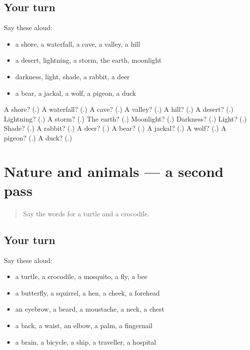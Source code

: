 \subsection*{Your turn}
Say these aloud:

\begin{itemize}
\raggedright
  \item a shore, a waterfall, a cave, a valley, a hill
  \item a desert, lightning, a storm, the earth, moonlight
  \item darkness, light, shade, a rabbit, a deer
  \item a bear, a jackal, a wolf, a pigeon, a duck
\end{itemize}

\begin{tcolorbox}[breakable,colback=teal!4,colframe=teal!35!black,title={Before you move on}]
A shore? (\textbf{}.) A waterfall? (\textbf{}.) A cave? (\textbf{}.) A valley? (\textbf{}.) A hill? (\textbf{}.) A desert? (\textbf{}.) Lightning? (\textbf{}.) A storm? (\textbf{}.) The earth? (\textbf{}.) Moonlight? (\textbf{}.) Darkness? (\textbf{}.) Light? (\textbf{}.) Shade? (\textbf{}.) A rabbit? (\textbf{}.) A deer? (\textbf{}.) A bear? (\textbf{}.) A jackal? (\textbf{}.) A wolf? (\textbf{}.) A pigeon? (\textbf{}.) A duck? (\textbf{}.)
\end{tcolorbox}
\section[(dialogue)]{Nature and animals — a second pass}

\label{lesson:GU-R127-second-pass-nature-and-animals}



\begin{quote}
Say the words for a turtle and a crocodile.
\end{quote}

\subsection*{Your turn}
Say these aloud:

\begin{itemize}
\raggedright
  \item a turtle, a crocodile, a mosquito, a fly, a bee
  \item a butterfly, a squirrel, a hen, a cheek, a forehead
  \item an eyebrow, a beard, a moustache, a neck, a chest
  \item a back, a waist, an elbow, a palm, a fingernail
  \item a brain, a bicycle, a ship, a traveller, a hospital
\end{itemize}

